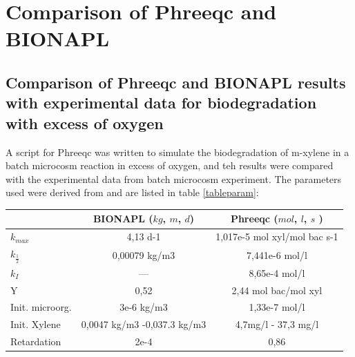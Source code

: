 \documentclass[12pt,twoside]{report}
\begin{document}
\chapter{Comparison of Phreeqc and BIONAPL}
\section{Comparison of Phreeqc and BIONAPL results with experimental data for biodegradation with excess of oxygen}
A script for Phreeqc was written to simulate the biodegradation of m-xylene in a batch microcosm reaction in excess of oxygen, and teh results were compared with the experimental data from \cite{schirmer_relative-least-squares_1999} batch microcosm experiment. The parameters used were derived from \cite{schirmer_relative-least-squares_1999} and are listed in table \eqref{tableparam}:

\begin{center}
    \begin{tabular}{ | l | c | c |}
    \hline
              & BIONAPL ($kg$, $m$, $d$) & Phreeqc ($mol$, $l$, $s$ ) \\ 
    \hline
    $k_{max}$ &         4,13 d-1         &    1,017e-5 mol xyl/mol bac s-1           \\ 
    \hline
    $k_{\frac{1}{2}}$ & 0,00079 kg/m3    &   7,441e-6 mol/l           \\ 
    \hline
    $k_{I}$           &      ---         &   8,65e-4 mol/l            \\
    \hline
    Y                 &     0,52         &    2,44 mol bac/mol xyl    \\
    \hline
    Init. microorg.   &    3e-6 kg/m3    &    1,33e-7 mol/l           \\
    \hline
    Init. Xylene      &     0,0047 kg/m3 -0,037.3 kg/m3 &     4,7mg/l - 37,3 mg/l                 \\
    \hline
    Retardation       &       2e-4        &   0,86                     \\
    \hline
    \end{tabular}\label{tableparam}
\end{center}
\end{document}
